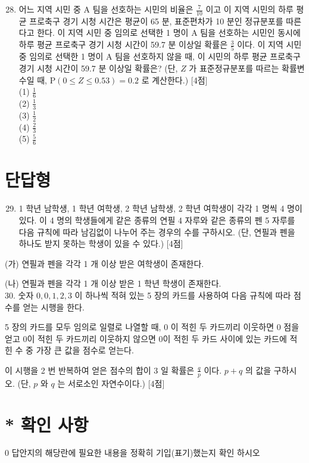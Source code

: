 \documentclass[10pt]{article}
\begin{document}
\begin{enumerate}
  \setcounter{enumi}{27}
  \item 어느 지역 시민 중 A 팀을 선호하는 시민의 비율은 \(\frac{7}{10}\) 이고 이 지역 시민의 하루 평균 프로축구 경기 시청 시간은 평균이 65 분, 표준편차가 10 분인 정규분포를 따른다고 한다. 이 지역 시민 중 임의로 선택한 1 명이 A 팀을 선호하는 시민인 동시에 하루 평균 프로축구 경기 시청 시간이 59.7 분 이상일 확률은 \(\frac{3}{5}\) 이다. 이 지역 시민 중 임의로 선택한 1 명이 A 팀을 선호하지 않을 때, 이 시민의 하루 평균 프로축구 경기 시청 시간이 59.7 분 이상일 확률은? (단, \(Z\) 가 표준정규분포를 따르는 확률변수일 때, \(\mathrm{P}(0 \leq Z \leq 0.53)=0.2\) 로 계산한다.) [4점]\\
(1) \(\frac{1}{6}\)\\
(2) \(\frac{1}{3}\)\\
(3) \(\frac{1}{2}\)\\
(4) \(\frac{2}{3}\)\\
(5) \(\frac{5}{6}\)
\end{enumerate}

\section*{단답형}
\begin{enumerate}
  \setcounter{enumi}{28}
  \item 1 학년 남학생, 1 학년 여학생, 2 학년 남학생, 2 학년 여학생이 각각 1 명씩 4 명이 있다. 이 4 명의 학생들에게 같은 종류의 연필 4 자루와 같은 종류의 펜 5 자루를 다음 규칙에 따라 남김없이 나누어 주는 경우의 수를 구하시오. (단, 연필과 펜을 하나도 받지 못하는 학생이 있을 수 있다.) [4점]
\end{enumerate}

(가) 연필과 펜을 각각 1 개 이상 받은 여학생이 존재한다.

(나) 연필과 펜을 각각 1 개 이상 받은 1 학년 학생이 존재한다.\\
30. 숫자 \(0,0,1,2,3\) 이 하나씩 적혀 있는 5 장의 카드를 사용하여 다음 규칙에 따라 점수를 얻는 시행을 한다.

5 장의 카드를 모두 임의로 일렬로 나열할 때, 0 이 적힌 두 카드끼리 이웃하면 0 점을 얻고 0이 적힌 두 카드끼리 이웃하지 않으면 0이 적힌 두 카드 사이에 있는 카드에 적힌 수 중 가장 큰 값을 점수로 얻는다.

이 시행을 2 번 반복하여 얻은 점수의 합이 3 일 확률은 \(\frac{q}{p}\) 이다. \(p+q\) 의 값을 구하시오. (단, \(p\) 와 \(q\) 는 서로소인 자연수이다.) [4점]

\section*{* 확인 사항}
0 답안지의 해당란에 필요한 내용을 정확히 기입(표기)했는지 확인 하시오
\end{document}
